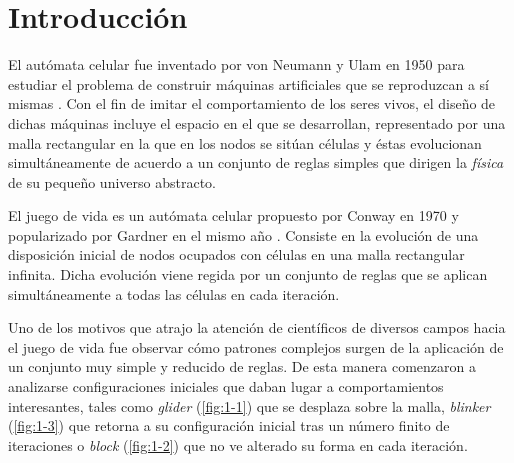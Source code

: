 \documentclass[../proyecto.tex]{book}
\begin{document}
\chapter{Introducción}

El autómata celular fue inventado por von Neumann y Ulam en 1950 para estudiar el problema de construir máquinas artificiales que se reproduzcan a sí mismas \cite{neummanUlam}. Con el fin de imitar el comportamiento de los seres vivos, el diseño de dichas máquinas incluye el espacio en el que se desarrollan, representado por una malla rectangular en la que en los nodos se sitúan células y éstas evolucionan simultáneamente de acuerdo a un conjunto de reglas simples que dirigen la \textit{física} de su pequeño universo abstracto. 

El juego de vida es un autómata celular propuesto por Conway en 1970 y popularizado por Gardner en el mismo año \cite{primerap}. Consiste en la evolución de una disposición inicial de nodos ocupados con células en una malla rectangular infinita. Dicha evolución viene regida por un conjunto de reglas que se aplican simultáneamente a todas las células en cada iteración.

Uno de los motivos que atrajo la atención de científicos de diversos campos hacia el juego de vida fue observar cómo patrones complejos surgen de la aplicación de un conjunto muy simple y reducido de reglas. De esta manera comenzaron a analizarse configuraciones iniciales que daban lugar a comportamientos interesantes, tales como \textit{glider} (\autoref{fig:1-1}) que se desplaza sobre la malla, \textit{blinker} (\autoref{fig:1-3}) que retorna a su configuración inicial tras un número finito de iteraciones o \textit{block} (\autoref{fig:1-2}) que no ve alterado su forma en cada iteración.
\end{document}
